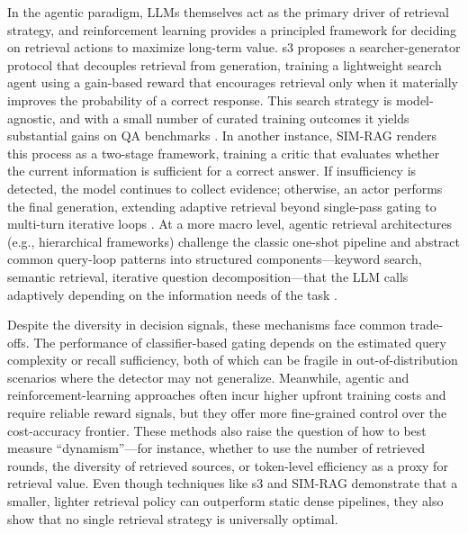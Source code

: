 \documentclass[11pt,a4paper]{article}
\begin{document}
In the agentic paradigm, LLMs themselves act as the primary driver of retrieval strategy, and reinforcement learning provides a principled framework for deciding on retrieval actions to maximize long-term value. s3 proposes a searcher-generator protocol that decouples retrieval from generation, training a lightweight search agent using a gain-based reward that encourages retrieval only when it materially improves the probability of a correct response. This search strategy is model-agnostic, and with a small number of curated training outcomes it yields substantial gains on QA benchmarks \cite{arxiv:2505.14146v2}. In another instance, SIM-RAG renders this process as a two-stage framework, training a critic that evaluates whether the current information is sufficient for a correct answer. If insufficiency is detected, the model continues to collect evidence; otherwise, an actor performs the final generation, extending adaptive retrieval beyond single-pass gating to multi-turn iterative loops \cite{arxiv:2505.02811v2}. At a more macro level, agentic retrieval architectures (e.g., hierarchical frameworks) challenge the classic one-shot pipeline and abstract common query-loop patterns into structured components---keyword search, semantic retrieval, iterative question decomposition---that the LLM calls adaptively depending on the information needs of the task \cite{arxiv:2501.09136v4} \cite{arxiv:2602.03442v1}.

Despite the diversity in decision signals, these mechanisms face common trade-offs. The performance of classifier-based gating depends on the estimated query complexity or recall sufficiency, both of which can be fragile in out-of-distribution scenarios where the detector may not generalize. Meanwhile, agentic and reinforcement-learning approaches often incur higher upfront training costs and require reliable reward signals, but they offer more fine-grained control over the cost-accuracy frontier. These methods also raise the question of how to best measure ``dynamism''---for instance, whether to use the number of retrieved rounds, the diversity of retrieved sources, or token-level efficiency as a proxy for retrieval value. Even though techniques like s3 and SIM-RAG demonstrate that a smaller, lighter retrieval policy can outperform static dense pipelines, they also show that no single retrieval strategy is universally optimal.
\end{document}
